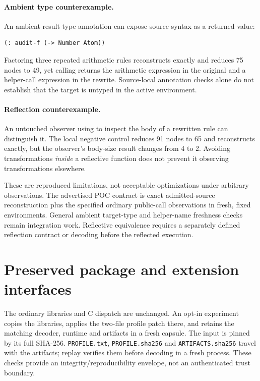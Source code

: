 \documentclass[11pt,a4paper]{article}
\newcommand{\code}[1]{\texttt{\detokenize{#1}}}
\newcommand{\file}[1]{\nolinkurl{#1}}
\begin{document}
\paragraph{Ambient type counterexample.}
An ambient result-type annotation can expose source syntax as a returned value:
\begin{lstlisting}
(: audit-f (-> Number Atom))
\end{lstlisting}
Factoring three repeated arithmetic
rules reconstructs exactly and reduces 75 nodes to 49, yet calling
\code{(audit-f 3)} returns the arithmetic expression in the original and a
helper-call expression in the rewrite. Source-local annotation checks alone
do not establish that the target is untyped in the active environment.

\paragraph{Reflection counterexample.}
An untouched observer using \code{match &self} to inspect the body of a
rewritten rule can distinguish it. The local negative control reduces
91 nodes to 65 and reconstructs exactly, but the observer's body-size result
changes from 4 to 2. Avoiding transformations \emph{inside} a reflective
function does not prevent it observing transformations elsewhere.

These are reproduced limitations, not acceptable optimizations under arbitrary
observations. The advertised POC contract is exact admitted-source reconstruction
plus the specified ordinary public-call observations in fresh, fixed
environments. General ambient target-type and helper-name freshness checks
remain integration work. Reflective equivalence requires a separately defined
reflection contract or decoding before the reflected execution.

\section{Preserved package and extension interfaces}

The ordinary libraries and C dispatch are unchanged. An opt-in experiment
copies the libraries, applies the two-file profile patch there, and retains
the matching decoder, runtime and artifacts in a fresh capsule. The input is
pinned by its full SHA-256. \file{PROFILE.txt}, \file{PROFILE.sha256} and
\file{ARTIFACTS.sha256} travel with the artifacts; replay verifies them before
decoding in a fresh process. These checks provide an integrity/reproducibility
envelope, not an authenticated trust boundary.
\end{document}
